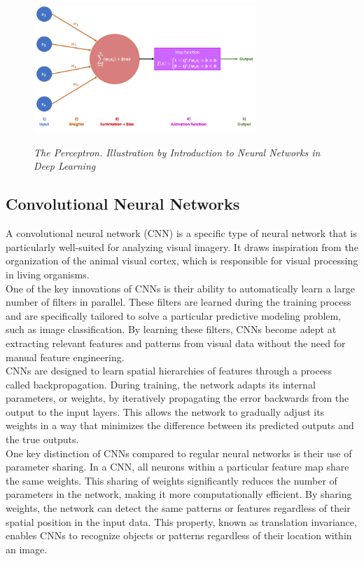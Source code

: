 \begin{figure}[H]
\centering
\includegraphics[width=0.75\textwidth]{imatges/preliminaries/perceptron.png}
\caption[The Perceptron]{\textit{The Perceptron. Illustration by Introduction to Neural Networks in Deep Learning}}
{\label{fig:perceptron}}
\end{figure}


\subsection{Convolutional Neural Networks}

A convolutional neural network (CNN) is a specific type of neural network that is particularly well-suited for analyzing visual imagery. It draws inspiration from the organization of the animal visual cortex, which is responsible for visual processing in living organisms. \\

One of the key innovations of CNNs is their ability to automatically learn a large number of filters in parallel. These filters are learned during the training process and are specifically tailored to solve a particular predictive modeling problem, such as image classification. By learning these filters, CNNs become adept at extracting relevant features and patterns from visual data without the need for manual feature engineering. \\

CNNs are designed to learn spatial hierarchies of features through a process called backpropagation. During training, the network adapts its internal parameters, or weights, by iteratively propagating the error backwards from the output to the input layers. This allows the network to gradually adjust its weights in a way that minimizes the difference between its predicted outputs and the true outputs. \\

One key distinction of CNNs compared to regular neural networks is their use of parameter sharing. In a CNN, all neurons within a particular feature map share the same weights. This sharing of weights significantly reduces the number of parameters in the network, making it more computationally efficient. By sharing weights, the network can detect the same patterns or features regardless of their spatial position in the input data. This property, known as translation invariance, enables CNNs to recognize objects or patterns regardless of their location within an image.\\

